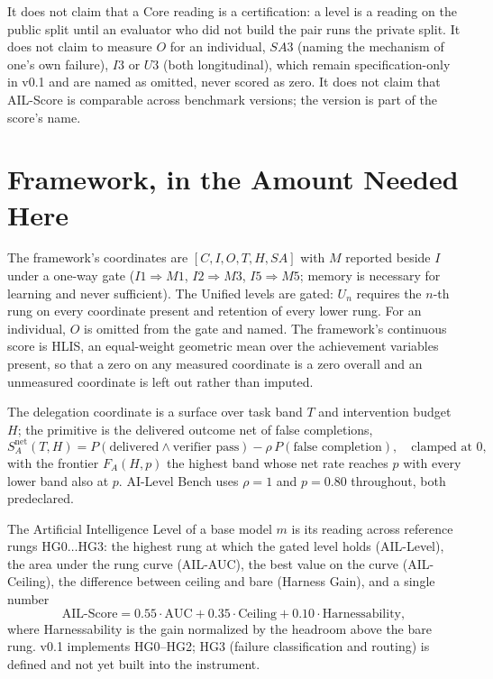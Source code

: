 \documentclass[11pt]{article}
\theoremstyle{definition}
\begin{document}
It does not claim that a Core reading is a certification: a level is a reading on the public split until an evaluator who did not build the pair runs the private split. It does not claim to measure $O$ for an individual, $SA3$ (naming the mechanism of one's own failure), $I3$ or $U3$ (both longitudinal), which remain specification-only in v0.1 and are named as omitted, never scored as zero. It does not claim that AIL-Score is comparable across benchmark versions; the version is part of the score's name.

\section{Framework, in the Amount Needed Here}\label{sec:framework}

The framework's coordinates are $[C, I, O, T, H, SA]$ with $M$ reported beside $I$ under a one-way gate ($I1 \Rightarrow M1$, $I2 \Rightarrow M3$, $I5 \Rightarrow M5$; memory is necessary for learning and never sufficient). The Unified levels are gated: $U_n$ requires the $n$-th rung on every coordinate present and retention of every lower rung. For an individual, $O$ is omitted from the gate and named. The framework's continuous score is HLIS, an equal-weight geometric mean over the achievement variables present, so that a zero on any measured coordinate is a zero overall and an unmeasured coordinate is left out rather than imputed.

The delegation coordinate is a surface over task band $T$ and intervention budget $H$; the primitive is the delivered outcome net of false completions,
\[
S^{\text{net}}_A(T,H) = P(\text{delivered} \wedge \text{verifier pass}) - \rho\,P(\text{false completion}), \quad \text{clamped at } 0,
\]
with the frontier $F_A(H,p)$ the highest band whose net rate reaches $p$ with every lower band also at $p$. AI-Level Bench uses $\rho = 1$ and $p = 0.80$ throughout, both predeclared.

The Artificial Intelligence Level of a base model $m$ is its reading across reference rungs $\mathrm{HG}0 \ldots \mathrm{HG}3$: the highest rung at which the gated level holds (AIL-Level), the area under the rung curve (AIL-AUC), the best value on the curve (AIL-Ceiling), the difference between ceiling and bare (Harness Gain), and a single number
\[
\text{AIL-Score} = 0.55\cdot\text{AUC} + 0.35\cdot\text{Ceiling} + 0.10\cdot\text{Harnessability},
\]
where Harnessability is the gain normalized by the headroom above the bare rung. v0.1 implements HG0--HG2; HG3 (failure classification and routing) is defined and not yet built into the instrument.
\end{document}
